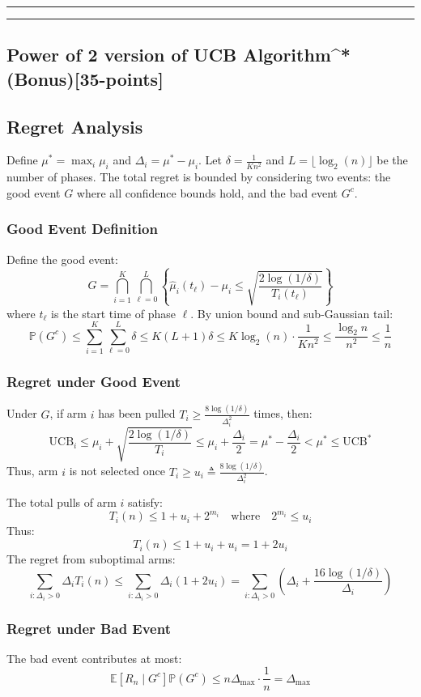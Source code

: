 \documentclass[12pt]{article}
\begin{document}
{{\noindent\rule{\textwidth}{0.2pt}
\noindent\rule{\textwidth}{0.2pt}

\subsection{Power of 2 version of UCB Algorithm^*(Bonus)[35-points]}

\subsection*{Regret Analysis}

Define $\mu^* = \max_i \mu_i$ and $\Delta_i = \mu^* - \mu_i$. Let $\delta = \frac{1}{Kn^2}$ and $L = \lfloor \log_2(n) \rfloor$ be the number of phases. The total regret is bounded by considering two events: the good event $G$ where all confidence bounds hold, and the bad event $G^c$.

\subsubsection*{Good Event Definition}
Define the good event:
\[
G = \bigcap_{i=1}^K \bigcap_{\ell=0}^L \left\{ \hat{\mu}_i(t_\ell) - \mu_i \leq \sqrt{\frac{2\log(1/\delta)}{T_i(t_\ell)}} \right\}
\]
where $t_\ell$ is the start time of phase $\ell$. By union bound and sub-Gaussian tail:
\[
\mathbb{P}(G^c) \leq \sum_{i=1}^K \sum_{\ell=0}^L \delta \leq K(L+1)\delta \leq K\log_2(n) \cdot \frac{1}{Kn^2} \leq \frac{\log_2 n}{n^2} \leq \frac{1}{n}
\]

\subsubsection*{Regret under Good Event}
Under $G$, if arm $i$ has been pulled $T_i \geq \frac{8\log(1/\delta)}{\Delta_i^2}$ times, then:
\[
\mathrm{UCB}_i \leq \mu_i + \sqrt{\frac{2\log(1/\delta)}{T_i}} \leq \mu_i + \frac{\Delta_i}{2} = \mu^* - \frac{\Delta_i}{2} < \mu^* \leq \mathrm{UCB}^*
\]
Thus, arm $i$ is not selected once $T_i \geq u_i \triangleq \frac{8\log(1/\delta)}{\Delta_i^2}$. 

The total pulls of arm $i$ satisfy:
\[
T_i(n) \leq 1 + u_i + 2^{m_i} \quad \text{where} \quad 2^{m_i} \leq u_i
\]
Thus:
\[
T_i(n) \leq 1 + u_i + u_i = 1 + 2u_i
\]
The regret from suboptimal arms:
\[
\sum_{i:\Delta_i > 0} \Delta_i T_i(n) \leq \sum_{i:\Delta_i > 0} \Delta_i (1 + 2u_i) = \sum_{i:\Delta_i > 0} \left( \Delta_i + \frac{16\log(1/\delta)}{\Delta_i} \right)
\]

\subsubsection*{Regret under Bad Event}
The bad event contributes at most:
\[
\mathbb{E}[R_n \mid G^c] \mathbb{P}(G^c) \leq n \Delta_{\max} \cdot \frac{1}{n} = \Delta_{\max}
\]

}}
\end{document}
